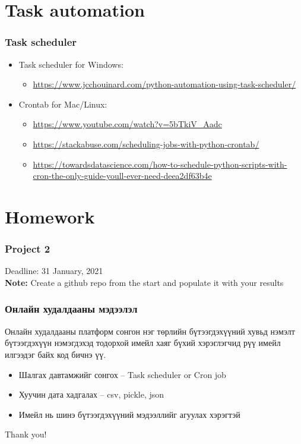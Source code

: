\documentclass{beamer}
\begin{document}
\section{Task automation} 

\begin{frame}
    \frametitle{Task scheduler}
        \begin{itemize}
            \item Task scheduler for Windows:
            \begin{itemize}
                \item \url{https://www.jcchouinard.com/python-automation-using-task-scheduler/}
            \end{itemize}
            
            
            \item Crontab for Mac/Linux:
            \begin{itemize}
                \item \url{https://www.youtube.com/watch?v=5bTkiV_Aadc}
                \item \url{https://stackabuse.com/scheduling-jobs-with-python-crontab/}
                \item \url{https://towardsdatascience.com/how-to-schedule-python-scripts-with-cron-the-only-guide-youll-ever-need-deea2df63b4e}
            \end{itemize}
        \end{itemize}
\end{frame}


\section{Homework} 

\begin{frame}
    \frametitle{Project 2}
\vskip 2mm
Deadline: 31 January, 2021 \\

\vfill
\textbf{Note:} Create a github repo from the start and populate it with your results
\end{frame}

\begin{frame}
    \frametitle{Онлайн худалдааны мэдээлэл}
    Онлайн худалдааны платформ сонгон нэг төрлийн бүтээгдэхүүний хувьд нэмэлт бүтээгдэхүүн нэмэгдэхэд тодорхой имейл хаяг бүхий хэрэглэгчид рүү имейл илгээдэг байх код бичнэ үү. 

    \begin{itemize}
        \item Шалгах давтамжийг сонгох – Task scheduler or Cron job
        \item Хуучин дата хадгалах – csv, pickle, json
        \item Имейл нь шинэ бүтээгдэхүүний мэдээллийг агуулах хэрэгтэй
    \end{itemize}
\end{frame}

\begin{frame}
\Huge{\centerline{Thank you!}}
\end{frame}

\end{document}
